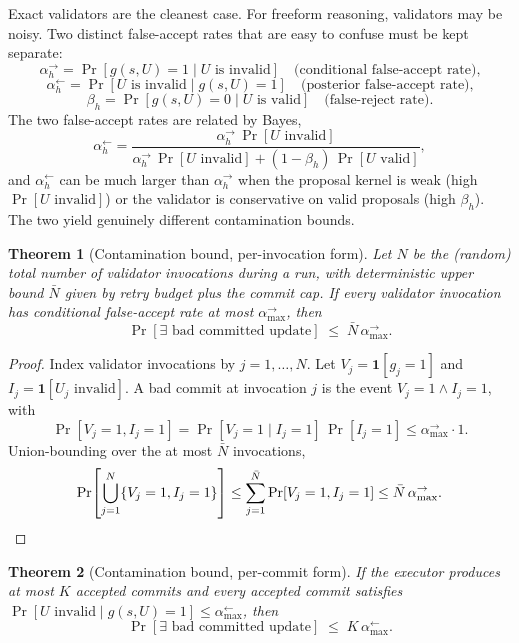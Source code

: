 \documentclass[11pt]{article}
\newtheorem{theorem}{Theorem}
\begin{document}
Exact validators are the cleanest case. For freeform reasoning, validators may
be noisy. Two distinct false-accept rates that are easy to confuse must be
kept separate:
\[
\alpha_h^{\rightarrow}
=
\Pr[g(s,U)=1 \mid U \text{ is invalid}]
\quad\text{(conditional false-accept rate),}
\]
\[
\alpha_h^{\leftarrow}
=
\Pr[U \text{ is invalid} \mid g(s,U)=1]
\quad\text{(posterior false-accept rate),}
\]
\[
\beta_h
=
\Pr[g(s,U)=0 \mid U \text{ is valid}]
\quad\text{(false-reject rate).}
\]
The two false-accept rates are related by Bayes,
\[
\alpha_h^{\leftarrow}
=
\frac{\alpha_h^{\rightarrow}\,\Pr[U \text{ invalid}]}
     {\alpha_h^{\rightarrow}\,\Pr[U \text{ invalid}]
      +(1-\beta_h)\,\Pr[U \text{ valid}]},
\]
and $\alpha_h^{\leftarrow}$ can be much larger than $\alpha_h^{\rightarrow}$
when the proposal kernel is weak (high $\Pr[U\text{ invalid}]$) or the
validator is conservative on valid proposals (high $\beta_h$). The two yield
genuinely different contamination bounds.

\begin{theorem}[Contamination bound, per-invocation form]
\label{thm:contamination-noisy-invocation}
Let $N$ be the (random) total number of validator invocations during a run,
with deterministic upper bound $\bar{N}$ given by retry budget plus the commit
cap. If every validator invocation has conditional false-accept rate at most
$\alpha_{\max}^{\rightarrow}$, then
\[
\Pr[\exists \text{ bad committed update}]
\;\le\;
\bar{N}\,\alpha_{\max}^{\rightarrow}.
\]
\end{theorem}

\begin{proof}
Index validator invocations by $j=1,\dots,N$. Let $V_j=\mathbf{1}[g_j=1]$ and
$I_j=\mathbf{1}[U_j \text{ invalid}]$. A bad commit at invocation $j$ is the
event $V_j=1\wedge I_j=1$, with
\[
\Pr[V_j=1, I_j=1]
=\Pr[V_j=1\mid I_j=1]\,\Pr[I_j=1]
\le \alpha_{\max}^{\rightarrow}\cdot 1.
\]
Union-bounding over the at most $\bar{N}$ invocations,
\[
\Pr\!\left[\bigcup_{j=1}^{N}\{V_j=1, I_j=1\}\right]
\le \sum_{j=1}^{\bar{N}}\Pr[V_j=1, I_j=1]
\le \bar{N}\,\alpha_{\max}^{\rightarrow}. \qedhere
\]
\end{proof}

\begin{theorem}[Contamination bound, per-commit form]
\label{thm:contamination-noisy-posterior}
If the executor produces at most $K$ accepted commits and every accepted commit
satisfies $\Pr[U\text{ invalid}\mid g(s,U)=1]\le\alpha_{\max}^{\leftarrow}$,
then
\[
\Pr[\exists \text{ bad committed update}]
\;\le\;K\,\alpha_{\max}^{\leftarrow}.
\]
\end{theorem}
\end{document}
